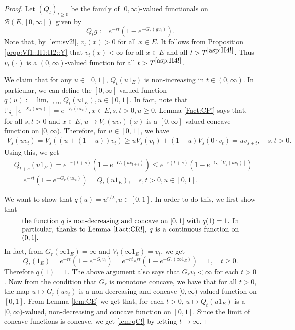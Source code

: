 \documentclass[12pt,a4paper]{amsart}
\numberwithin{equation}{section}
\theoremstyle{plain}
\theoremstyle{definition}
\theoremstyle{remark}
\begin{document}
\begin{proof}
	Let $(Q_t)_{t\geq 0}$ be the family of $[0,\infty)$-valued functionals on $\mathcal B(E,[0,\infty])$ given by
\[
	Q_tg
	:= e^{- r t}( 1 - e^{-G_r(gv_t)} ).
\]
	Note that, by \eqref{lem:sv2!}, $v_t(x)>0$ for all $x\in E$.
	It follows  from Proposition \ref{prop:Vf1::H1:H2::Y} that $v_t(x)<\infty$ for all $x\in E$ and all $t> T^{\eqref{asp:H4!}}$.
	Thus $v_t(\cdot)$ is a $(0,\infty)$-valued function for all $t> T^{\eqref{asp:H4!}}$.

	We claim that for any $u \in [0,1]$, $Q_t(u 1_E)$ is non-increasing in $t\in (0,\infty)$.
	In particular, we can define the $[0,\infty]$-valued function $q(u):= \lim_{t\to \infty} Q_t(u 1_E), u\in [0,1]$.
	In fact, note that $\mathbb P_{\delta_x}[e^{- X_s(uv_t)}] = e^{-V_s(uv_t)},x\in E, s,t>0, u \geq 0$.
	Lemma \ref{Fact:CP!} says that, for all $s,t > 0$ and $x\in E$, $u\mapsto V_s(uv_t)(x) $ is a $[0,\infty]$-valued concave function on $[0,\infty)$.
	Therefore, for $u\in [0,1]$, we have
\begin{align}
	V_s(uv_t)
	=V_s((u+ (1-u))v_t)
	\geq uV_s(v_t) + (1-u) V_s(0\cdot v_t)
	= uv_{s+t},
	\quad s,t > 0.
\end{align}
	Using this, we get
\begin{align}
	& Q_{t+s}(u 1_E)
	= e^{- r (t+s)} ( 1-e^{-G_r(uv_{t+s})} )
	\leq e^{- r(t+s)}( 1-e^{-G_r[V_s(uv_t)]} ) \\
	& = e^{-r t}( 1-e^{-G_r(uv_t)} )
	= Q_t(u 1_E),
	\quad s,t > 0, u \in [0,1].
\end{align}

	We want to show that $q(u)= u^{r/\lambda}, u\in [0,1]$.
	In order to do this, we first show that
\begin{equation} \label{lem:qC!}
\begin{minipage}{0.9\textwidth}
	the function $q$ is non-decreasing and concave on $[0,1]$ with $q(1) = 1$.
	In particular, thanks to Lemma \ref{Fact:CR!}, $q$ is a continuous function on $(0,1]$.
\end{minipage}
\end{equation}
	In fact, from $G_r(\infty 1_E) = \infty$ and $V_t(\infty 1_E) = v_t$, we get
	\[
	Q_t( 1_E)
	= e^{- r t} ( 1-e^{-G_r v_t} )
	= e^{- r t} e^{r t}( 1-e^{-G_r (\infty 1_E)} )
	= 1,
	\quad t\geq 0.
	\]
	Therefore $q(1) = 1$.
	The above argument also says that $G_r v_t < \infty$ for each $t>0$.
	Now from the condition that $G_r$ is monotone concave, we have that for all $t>0$, the map $u \mapsto G_r(uv_t)$ is a non-decreasing and concave $[0,\infty)$-valued function on $[0,1]$.
	From Lemma \ref{lem:CE} we get that, for each $t> 0$, $u \mapsto Q_t(u 1_E)$ is a $[0,\infty)$-valued, non-decreasing and concave function on $[0,1]$.
	Since the limit of concave functions is concave, we get \eqref{lem:qC!} by letting $t\to \infty$.


\end{proof}
\end{document}
